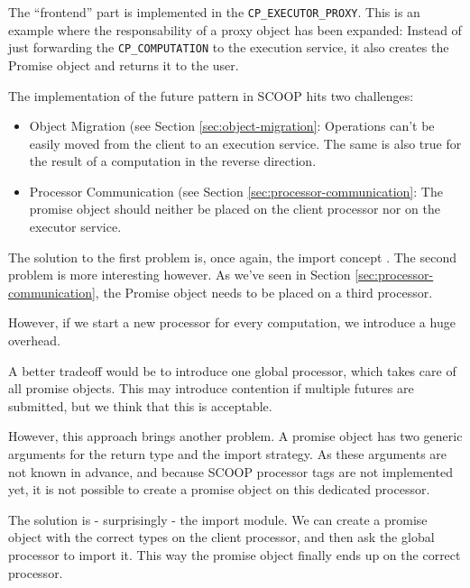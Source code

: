 The ``frontend'' part is implemented in the \lstinline!CP_EXECUTOR_PROXY!.
This is an example where the responsability of a proxy object has been expanded:
Instead of just forwarding the \lstinline!CP_COMPUTATION! to the execution service, it also creates the Promise object and returns it to the user.

The implementation of the future pattern in SCOOP hits two challenges:
\begin{itemize}
 \item Object Migration (see Section \ref{sec:object-migration}: Operations can't be easily moved from the client to an execution service.
 The same is also true for the result of a computation in the reverse direction.
 \item Processor Communication (see Section \ref{sec:processor-communication}: The promise object should neither be placed on the client processor nor on the executor service.
\end{itemize}

The solution to the first problem is, once again, the import concept \todoref.
The second problem is more interesting however.
As we've seen in Section \ref{sec:processor-communication}, the Promise object needs to be placed on a third processor.

However, if we start a new processor for every computation, we introduce a huge overhead.

A better tradeoff would be to introduce one global processor, which takes care of all promise objects.
This may introduce contention if multiple futures are submitted, but we think that this is acceptable.

However, this approach brings another problem.
A promise object has two generic arguments for the return type and the import strategy.
As these arguments are not known in advance, and because SCOOP processor tags  are not implemented yet, it is not possible to create a promise object on this dedicated processor.

The solution is - surprisingly - the import module.
We can create a promise object with the correct types on the client processor, and then ask the global processor to import it.
This way the promise object finally ends up on the correct processor.

